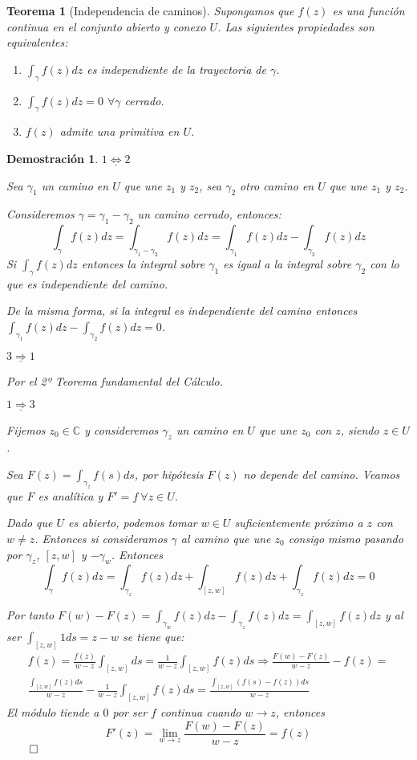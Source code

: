 \documentclass[12pt]{book}
\newtheorem{theorem}{Teorema}[chapter]
\newtheorem*{dem}{Demostración}
\newcommand{\C}{\mathbb{C}}
\begin{document}
\begin{theorem}[Independencia de caminos]
Supongamos que $f(z)$ es una función continua en el conjunto abierto y conexo $U$. Las siguientes propiedades son equivalentes:
\begin{enumerate}
\item $\displaystyle\int_{\gamma}f(z)dz$ es independiente de la trayectoria de $\gamma$.
\item  $\displaystyle\int_{\gamma}f(z)dz = 0$ $\forall \gamma$ cerrado.
\item $f(z)$ admite una primitiva en $U$.
\end{enumerate}
\end{theorem}


\begin{dem}
$\underline{1 \Leftrightarrow 2}$

Sea $\gamma_1$ un camino en $U$ que une $z_1$ y $z_2$, sea $\gamma_2$ otro camino en $U$ que une $z_1$ y $z_2$.

Consideremos $\gamma = \gamma_1 -\gamma_2$ un camino cerrado, entonces:
$$\int_\gamma f(z)dz = \int_{\gamma_1 -\gamma_2} f(z)dz = \int_{\gamma_1} f(z)dz - \int_{\gamma_2} f(z)dz$$
Si $\int_\gamma f(z)dz$ entonces la integral sobre $\gamma_1$ es igual a la integral sobre $\gamma_2$ con lo que es independiente del camino.

De la misma forma, si la integral es independiente del camino entonces $\displaystyle\int_{\gamma_1} f(z)dz - \int_{\gamma_2} f(z)dz = 0$.

$\underline{3 \Rightarrow 1}$

Por el 2º Teorema fundamental del Cálculo.

$\underline{1 \Rightarrow 3}$

Fijemos $z_0 \in \C$ y consideremos $\gamma_z$ un camino en $U$ que une $z_0$ con $z$, siendo $z \in U$.

Sea $F(z) = \int_{\gamma_z}f(s)ds$, por hipótesis $F(z)$ no depende del camino. Veamos que $F$ es analítica y $F'=f \ \forall z \in U$.

Dado que $U$ es abierto, podemos tomar $w\in U$ suficientemente próximo a $z$ con $w\neq z$. Entonces si consideramos $\gamma$ al camino que une $z_0$ consigo mismo pasando por $\gamma_z$, $[z,w]$ y $-\gamma_w$. Entonces
$$
\int_\gamma f(z)dz = \int_{\gamma_z} f(z)dz + \int_{[z,w]} f(z)dz + \int_{\gamma_z} f(z)dz = 0
$$ 

Por tanto $F(w)-F(z) = \int_{\gamma_w} f(z)dz - \int_{\gamma_z} f(z)dz = \int_{[z,w]} f(z)dz$ y al ser $\int_[z,w] 1ds = z-w$ se tiene que:
\begin{multline*}
f(z) = \frac{f(z)}{w-z}\int_{[z,w]}ds= \frac{1}{w-z}\int_{[z,w]}f(z)ds \Rightarrow \frac{F(w)-F(z)}{w-z}-f(z) =\\
\frac{\int_{[z,w]}f(z)ds}{w-z}-\frac{1}{w-z}\int_{[z,w]}f(z)ds = \frac{\int_{[z,w]}(f(s)-f(z))ds}{w-z}
\end{multline*}
El módulo tiende a $0$ por ser $f$ continua cuando $w \to z$, entonces 
$$F'(z) = \lim_{w\to z}\frac{F(w)-F(z)}{w-z} = f(z)$$
$\qed$

\end{dem}
\end{document}
